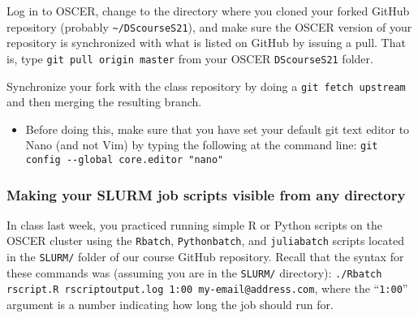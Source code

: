 \documentclass[12pt,english]{exam}
\begin{document}
\begin{questions}
\question Log in to OSCER, change to the directory where you cloned your forked GitHub repository (probably \texttt{\textasciitilde/DScourseS21}), and make sure the OSCER version of your repository is synchronized with what is listed on GitHub by issuing a pull. That is, type \texttt{git pull origin master} from your OSCER \texttt{DScourseS21} folder. 

\question Synchronize your fork with the class repository by doing a \texttt{git fetch upstream} and then merging the resulting branch. 
\begin{itemize}
	\item Before doing this, make sure that you have set your default git text editor to Nano (and not Vim) by typing the following at the command line: \texttt{git config -{}-global core.editor "nano"}
\end{itemize}

\subsubsection*{Making your SLURM job scripts visible from any directory}

\question In class last week, you practiced running simple R or Python scripts on the OSCER cluster using the \texttt{Rbatch}, \texttt{Pythonbatch}, and \texttt{juliabatch} scripts located in the \texttt{SLURM/} folder of our course GitHub repository. Recall that the syntax for these commands was (assuming you are in the \texttt{SLURM/} directory): \texttt{./Rbatch rscript.R rscriptoutput.log 1:00 my-email@address.com}, where the ``\texttt{1:00}'' argument is a number indicating how long the job should run for.


\end{questions}
\end{document}
